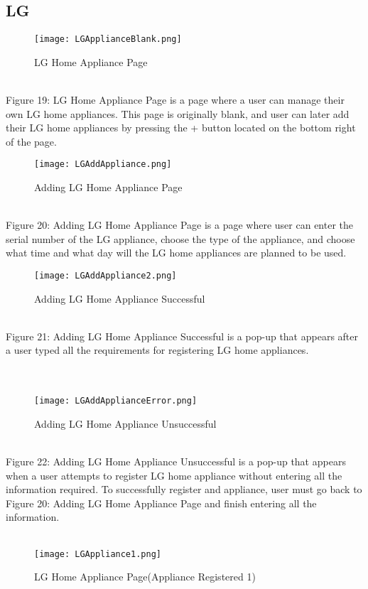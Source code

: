 \documentclass[conference]{IEEEtran}
\begin{document}
\subsection{LG}
\begin{figure}[h]
\centerline{\texttt{[image: LGApplianceBlank.png]}}
\caption{LG Home Appliance Page}
\label{fig}
\end{figure}
\\
Figure 19: LG Home Appliance Page is a page where a user can manage their own LG home appliances. This page is originally blank, and user can later add their LG home appliances by pressing the + button located on the bottom right of the page. 
\begin{figure}[h]
\centerline{\texttt{[image: LGAddAppliance.png]}}
\caption{Adding LG Home Appliance Page}
\label{fig}
\end{figure}
\\
\indent Figure 20: Adding LG Home Appliance Page is a page where user can enter the serial number of the LG appliance, choose the type of the appliance, and choose what time and what day will the LG home appliances are planned to be used.
\\
\clearpage
\begin{figure}[h]
\centerline{\texttt{[image: LGAddAppliance2.png]}}
\caption{Adding LG Home Appliance Successful}
\label{fig}
\end{figure}
\\
Figure 21: Adding LG Home Appliance Successful is a pop-up that appears after a user typed all the requirements for registering LG home appliances.
\\\\\\
\begin{figure}[h]
\centerline{\texttt{[image: LGAddApplianceError.png]}}
\caption{Adding LG Home Appliance Unsuccessful}
\label{fig}
\end{figure}
\\
\indent Figure 22: Adding LG Home Appliance Unsuccessful is a pop-up that appears when a user attempts to register LG home appliance without entering all the information required. To successfully register and appliance, user must go back to Figure 20: Adding LG Home Appliance Page and finish entering all the information.
\\\\
\begin{figure}[h]
\centerline{\texttt{[image: LGAppliance1.png]}}
\caption{LG Home Appliance Page(Appliance Registered 1)}
\label{fig}
\end{figure}
\end{document}
